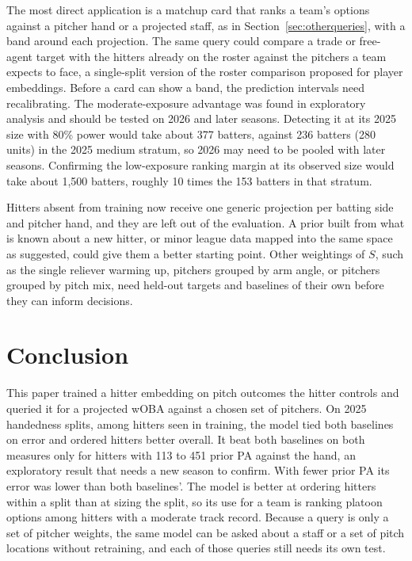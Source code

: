 \documentclass[11pt,letterpaper]{article}
\begin{document}
The most direct application is a matchup card that ranks a team's options against a pitcher hand or a projected staff, as in Section~\ref{sec:otherqueries}, with a band around each projection. The same query could compare a trade or free-agent target with the hitters already on the roster against the pitchers a team expects to face, a single-split version of the roster comparison \citet{alcorn2018} proposed for player embeddings. Before a card can show a band, the prediction intervals need recalibrating. The moderate-exposure advantage was found in exploratory analysis and should be tested on 2026 and later seasons. Detecting it at its 2025 size with 80\% power would take about 377 batters, against 236 batters (280 units) in the 2025 medium stratum, so 2026 may need to be pooled with later seasons. Confirming the low-exposure ranking margin at its observed size would take about 1,500 batters, roughly 10 times the 153 batters in that stratum.

Hitters absent from training now receive one generic projection per batting side and pitcher hand, and they are left out of the evaluation. A prior built from what is known about a new hitter, or minor league data mapped into the same space as \citet{alcorn2018} suggested, could give them a better starting point. Other weightings of $S$, such as the single reliever warming up, pitchers grouped by arm angle, or pitchers grouped by pitch mix, need held-out targets and baselines of their own before they can inform decisions.

\section{Conclusion}
\label{sec:conclusion}

This paper trained a hitter embedding on pitch outcomes the hitter controls and queried it for a projected wOBA against a chosen set of pitchers. On 2025 handedness splits, among hitters seen in training, the model tied both baselines on error and ordered hitters better overall. It beat both baselines on both measures only for hitters with 113 to 451 prior PA against the hand, an exploratory result that needs a new season to confirm. With fewer prior PA its error was lower than both baselines'. The model is better at ordering hitters within a split than at sizing the split, so its use for a team is ranking platoon options among hitters with a moderate track record. Because a query is only a set of pitcher weights, the same model can be asked about a staff or a set of pitch locations without retraining, and each of those queries still needs its own test.



\end{document}
